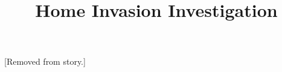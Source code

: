 \documentclass[11pt]{article}
\begin{document}
\ttfamily
\title{Home Invasion Investigation}
\maketitle

[Removed from story.]
\end{document}
